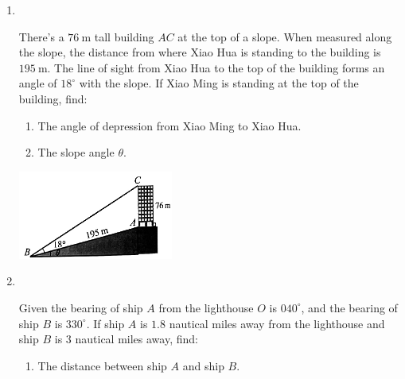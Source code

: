 \documentclass{report}
\begin{document}
\begin{enumerate}
        \vspace{3em}
        \item \parbox[t]{0.9\textwidth}{
            ~
            \vspace{-1.1em}
            \begin{vwcol}[widths={0.6,0.4}, sep=8mm, rule=0pt]
               There's a $76 \mathrm{~m}$ tall building $AC$ at the top of a slope. When measured along the slope, the distance from where Xiao Hua is standing to the building is $195 \mathrm{~m}$. The line of sight from Xiao Hua to the top of the building forms an angle of $18^\circ$ with the slope. If Xiao Ming is standing at the top of the building, find:

                \noindent \parbox[t]{0.5\textwidth}{
                    \begin{enumerate}
                        \item The angle of depression from Xiao Ming to Xiao Hua.
                        \item The slope angle $\theta$.
                    \end{enumerate}
                }
    
                \includegraphics[width=0.4\textwidth]{assets/10-91.jpg}
            \end{vwcol}
        }
        
        \vspace{-2em}
        \item \parbox[t]{0.9\textwidth}{
            ~
            \vspace{-1.1em}
            \begin{vwcol}[widths={0.6,0.4}, sep=8mm, rule=0pt]
               Given the bearing of ship $A$ from the lighthouse $O$ is $040^\circ$, and the bearing of ship $B$ is $330^\circ$. If ship $A$ is $1.8$ nautical miles away from the lighthouse and ship $B$ is $3$ nautical miles away, find:

                \noindent \parbox[t]{0.5\textwidth}{
                    \begin{enumerate}
                        \item The distance between ship $A$ and ship $B$.


\end{enumerate}}
\end{vwcol}}
\end{enumerate}
\end{document}
